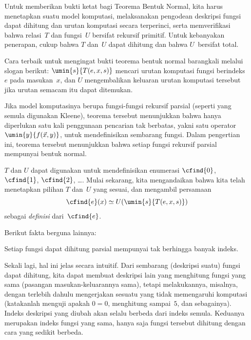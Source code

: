 \documentclass[../../../include/open-logic-section]{subfiles}
\begin{document}
\begin{explain}
Untuk memberikan bukti ketat bagi Teorema Bentuk Normal, kita harus menetapkan
suatu model komputasi, melaksanakan pengodean deskripsi fungsi dapat dihitung
dan urutan komputasi secara terperinci, serta memverifikasi bahwa relasi~$T$
dan fungsi~$U$ bersifat rekursif primitif. Untuk kebanyakan penerapan, cukup
bahwa $T$ dan~$U$ dapat dihitung dan bahwa $U$~bersifat total.

Cara terbaik untuk mengingat bukti teorema bentuk normal barangkali melalui
slogan berikut: $\umin{s}{T(e, x, s)}$ mencari urutan komputasi fungsi
berindeks~$e$ pada masukan~$x$, dan $U$ mengembalikan keluaran urutan komputasi
tersebut jika urutan semacam itu dapat ditemukan.
\end{explain}

Jika model komputasinya berupa fungsi-fungsi rekursif parsial (seperti yang
semula digunakan Kleene), teorema tersebut menunjukkan bahwa hanya diperlukan
satu kali penggunaan pencarian tak berbatas, yakni satu operator
$\umin{y}{f(\vec x, y)}$, untuk mendefinisikan sembarang fungsi. Dalam
pengertian ini, teorema tersebut menunjukkan bahwa setiap fungsi rekursif
parsial mempunyai bentuk normal.

$T$ dan $U$ dapat digunakan untuk mendefinisikan enumerasi $\cfind{0}$,
$\cfind{1}$, $\cfind{2}$, \dots. Mulai sekarang, kita mengandaikan bahwa kita
telah menetapkan pilihan $T$ dan~$U$ yang sesuai, dan mengambil persamaan
\[
\cfind{e}(x) \simeq U(\umin{s}{T(e,x,s)})
\]
sebagai \emph{definisi} dari~$\cfind{e}$.

Berikut fakta berguna lainnya:

\begin{thm}
Setiap fungsi dapat dihitung parsial mempunyai tak berhingga banyak indeks.
\end{thm}

Sekali lagi, hal ini jelas secara intuitif. Dari sembarang (deskripsi suatu)
fungsi dapat dihitung, kita dapat membuat deskripsi lain yang menghitung fungsi
yang sama (pasangan masukan-keluarannya sama), tetapi melakukannya, misalnya,
dengan terlebih dahulu mengerjakan sesuatu yang tidak memengaruhi komputasi
(katakanlah menguji apakah $0 = 0$, menghitung sampai~$5$, dan sebagainya).
Indeks deskripsi yang diubah akan selalu berbeda dari indeks semula. Keduanya
merupakan indeks fungsi yang sama, hanya saja fungsi tersebut dihitung dengan
cara yang sedikit berbeda.
\end{document}
